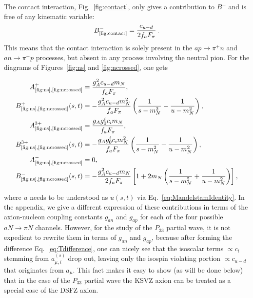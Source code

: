\documentclass[reprint,amssymb,amsmath,floatfix,aps,prd,groupedaddress,nofootinbib]{revtex4-2}
\begin{document}
The contact interaction, Fig.~\ref{fig:contact}, only gives a contribution to $B^-$ and is free
of any kinematic variable:
\begin{equation}
B^-_\text{\ref{fig:contact}} = \frac{c_{u-d}}{2f_a F_\pi}\,.
\end{equation}
This means that the contact interaction is solely present in the $a p\to \pi^+ n$ and $a n\to \pi^- p$
processes, but absent in any process involving the neutral pion. For the diagrams of
Figures~\ref{fig:ns} and \ref{fig:ncrossed}, one gets
\begin{widetext}
\begin{align}
\begin{split}
A^+_\text{\ref{fig:ns},\ref{fig:ncrossed}} & = \frac{g_A^2 c_{u-d} m_N}{f_a F_\pi} , \\  B^+_\text{\ref{fig:ns},\ref{fig:ncrossed}} (s,t) & = -\frac{g_A^2 c_{u-d} m_N^2}{f_a F_\pi} \left(\frac{1}{s-m_N^2}-\frac{1}{u-m_N^2}\right), \\
A^{3+}_\text{\ref{fig:ns},\ref{fig:ncrossed}}  & = \frac{g_A g_0^i c_i m_N}{f_a F_\pi} , \\  B^{3+}_\text{\ref{fig:ns},\ref{fig:ncrossed}} (s,t) & = - \frac{g_A g_0^i c_i m_N^2}{f_a F_\pi}\left(\frac{1}{s-m_N^2}-\frac{1}{u-m_N^2}\right)  , \\
A^-_\text{\ref{fig:ns},\ref{fig:ncrossed}} & = 0 , \\ B^-_\text{\ref{fig:ns},\ref{fig:ncrossed}} (s,t) & = - \frac{g_A^2 c_{u-d} m_N}{2 f_a F_\pi} \left[1+2m_N\left(\frac{1}{s-m_N^2}+\frac{1}{u-m_N^2}\right) \right],\end{split}
\end{align}
\end{widetext}
where $u$ needs to be understood as $u(s,t)$ via Eq.~\eqref{eq:MandelstamIdentity}. In the appendix, we give a different expression of these
contributions in terms of the axion-nucleon coupling constants $g_{an}$ and $g_{ap}$ for each of the
four possible $aN\to \pi N$ channels. However, for the study of the $P_{33}$ partial wave, it is not
expedient to rewrite them in terms of $g_{an}$ and $g_{ap}$, because after forming the difference
Eq.~\eqref{eq:Tdifference}, one can nicely see that the isoscalar terms $\propto c_i$ stemming from
$a_{\mu,i}^{(s)}$ drop out, leaving only the isospin violating portion $\propto c_{u-d}$ that originates
from $a_\mu$. This fact makes it easy to show (as will be done below) that in the case of the $P_{33}$
partial wave the KSVZ axion can be treated as a special case of the DSFZ axion.
\end{document}
